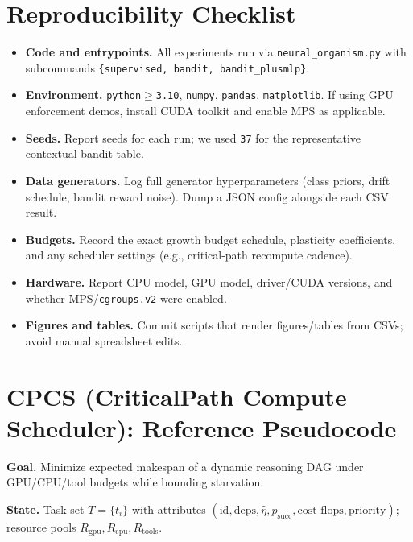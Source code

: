 \documentclass[
]{article}
\begin{document}
\section*{Reproducibility Checklist}
\begin{itemize}
  \item \textbf{Code and entrypoints.} All experiments run via \texttt{neural\_organism.py} with subcommands \texttt{\{supervised, bandit, bandit\_plusmlp\}}.
  \item \textbf{Environment.} \texttt{python$\ge$3.10}, \texttt{numpy}, \texttt{pandas}, \texttt{matplotlib}. If using GPU enforcement demos, install CUDA toolkit and enable MPS as applicable.
  \item \textbf{Seeds.} Report seeds for each run; we used \texttt{37} for the representative contextual bandit table.
  \item \textbf{Data generators.} Log full generator hyperparameters (class priors, drift schedule, bandit reward noise). Dump a JSON config alongside each CSV result.
  \item \textbf{Budgets.} Record the exact growth budget schedule, plasticity coefficients, and any scheduler settings (e.g., critical-path recompute cadence).
  \item \textbf{Hardware.} Report CPU model, GPU model, driver/CUDA versions, and whether MPS/\texttt{cgroups.v2} were enabled.
  \item \textbf{Figures and tables.} Commit scripts that render figures/tables from CSVs; avoid manual spreadsheet edits.
\end{itemize}

\section*{CPCS (Critical\-Path Compute Scheduler): Reference Pseudocode}
\noindent\textbf{Goal.} Minimize expected makespan of a dynamic reasoning DAG under GPU/CPU/tool budgets while bounding starvation.

\noindent\textbf{State.} Task set $T=\{t_i\}$ with attributes $(\text{id}, \text{deps}, \widehat{\eta}, p_{\text{succ}}, \text{cost\_flops}, \text{priority})$; resource pools $R_{\text{gpu}}, R_{\text{cpu}}, R_{\text{tools}}$.
\end{document}
